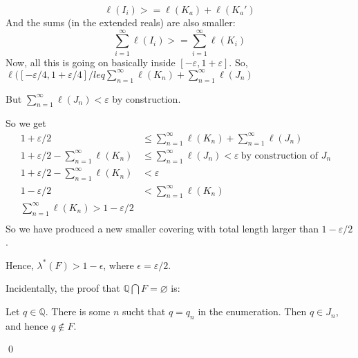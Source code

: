 \documentclass[11pt,oneside]{article}
\numberwithin{equation}{section}
\theoremstyle{definition}
\def\QQ{\mathbb{Q}}
\begin{document}
\begin{solution}
\begin{enumerate}[(a)]
      $$ \ell(I_i) >= \ell(K_a) + \ell(K_a')
      $$
      And the sums (in the extended reals) are also smaller:
      $$
      \sum \limits _ {i=1} ^ \infty \ell(I_i) >= \sum \limits _ { i = 1} ^ \infty \ell(K_i )
      $$
      Now, all this is going on basically inside $[-\varepsilon,1 + \varepsilon]$.  So,
      $\ell([-\varepsilon/4,1 + \varepsilon/4] /leq \sum \limits _ {n=1}^\infty \ell(K_n) + \sum \limits _ {n=1}^\infty \ell(J_n)$

      But  $\sum \limits _ {n=1}^\infty \ell(J_n) < \varepsilon$ by construction.

      So we get
      \begin{align*}
        1 + \varepsilon /2 & \leq \sum \limits _ {n=1}^\infty \ell(K_n) + \sum \limits _ {n=1}^\infty \ell(J_n)  & \\
        1 + \varepsilon / 2 - \sum \limits _ {n=1}^\infty \ell(K_n) & \leq \sum \limits _ {n=1}^\infty \ell(J_n)  < \varepsilon \ \textrm{by construction of $J_n$} & \\
        1 + \varepsilon / 2  -  \sum \limits _ {n=1}^\infty \ell(K_n) & < \varepsilon & \\
        1 -  \varepsilon /2 & < \sum \limits _ {n=1}^\infty \ell(K_n) &  \\
        \sum \limits _ {n=1}^\infty \ell(K_n)  > 1 - \varepsilon / 2 \\
      \end{align*}
      So we have produced a new smaller covering with total length larger than $1 - \varepsilon  / 2$.

      Hence, $ \lambda^*(F) > 1 - \epsilon$, where $\epsilon = \varepsilon / 2$.

      Incidentally, the proof that $ \QQ \bigcap F = \varnothing$ is:

      Let $q \in \QQ$.  There is some $n$ sucht that $q =q_n$ in the enumeration.
      Then $q \in J_n$, and hence $q \notin F$.

      \qed
  \end{enumerate}
\end{solution}
\end{document}
